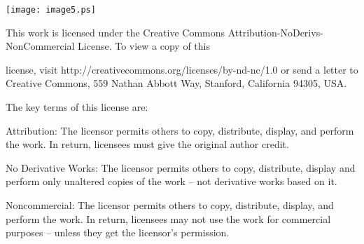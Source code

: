 \documentclass[a4paper,11pt]{book}
\begin{document}
 

\noindent  

\noindent  

\noindent  

\noindent 

\noindent \texttt{[image: image5.ps]}

\noindent 

\noindent This work is licensed under the Creative Commons Attribution-NoDerivs-NonCommercial License. To view a copy of this

\noindent license, visit http://creativecommons.org/licenses/by-nd-nc/1.0 or send a letter to Creative Commons, 559 Nathan Abbott Way, Stanford, California 94305, USA.

\noindent 

\noindent The key terms of this license are:

\noindent 

\noindent Attribution: The licensor permits others to copy, distribute, display, and perform the work. In return, licensees must give the original author credit.

\noindent 

\noindent No  Derivative  Works: The licensor permits others to copy, distribute, display and perform only unaltered copies of the work -- not derivative works based on it.

\noindent 

\noindent Noncommercial: The licensor permits others to copy, distribute, display, and perform the work. In return, licensees may not use the work for commercial purposes -- unless they get the licensor's permission.
\end{document}

